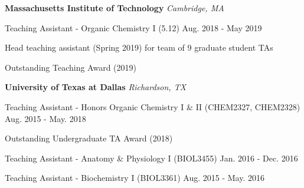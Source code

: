 
\begin{rSection}{}{\bodyfont\bfseries\color{black} \hspace{-1.6em} {Massachusetts Institute of Technology}} \hfill{\bodyfont\slshape\color{awesome} {Cambridge, MA}}
\end{rSection}

\begin{cventries}

  \cventry
    {Teaching Assistant - Organic Chemistry I (5.12)} %
    {} %
    {} %
    {Aug. 2018 - May 2019} %
    {
      \begin{cvitems} %
        \item[] {Head teaching assistant (Spring 2019) for team of 9 graduate student TAs}
        \item[] {Outstanding Teaching Award (2019)}
      \end{cvitems}
    }

\begin{rSection}{}{\bodyfont\bfseries\color{black} \hspace{-1.6em} {University of Texas at Dallas}} \hfill{\bodyfont\slshape\color{awesome} {Richardson, TX}}
\end{rSection}

\cventry
{Teaching Assistant - Honors Organic Chemistry I \& II (CHEM2327, CHEM2328)} %
{} %
{} %
{Aug. 2015 - May. 2018} %
{
  \begin{cvitems} %
    \item[] {Outstanding Undergraduate TA Award (2018)}
  \end{cvitems}
}

\cventryshort
  {Teaching Assistant - Anatomy \& Physiology I (BIOL3455)} %
  {} %
  {} %
  {Jan. 2016 - Dec. 2016} %

\cventryshort
{Teaching Assistant - Biochemistry I (BIOL3361)} %
{} %
{} %
{Aug. 2015 - May. 2016} %

\end{cventries}
